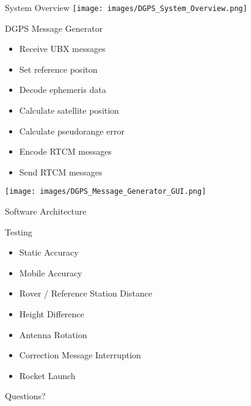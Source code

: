 \documentclass[12pt, compress, xcolor=table]{beamer}
\begin{document}
\begin{frame}{System Overview}
 \texttt{[image: images/DGPS\_System\_Overview.png]}
\end{frame}

\begin{frame}{DGPS Message Generator}
 \begin{minipage}{0.6\textwidth}
  \begin{itemize}
   \setlength\itemsep{0.3cm}
   \item Receive UBX messages
   \item Set reference positon
   \item Decode ephemeris data
   \item Calculate satellite position
   \item Calculate pseudorange error
   \item Encode RTCM messages
   \item Send RTCM messages
  \end{itemize}
 \end{minipage}
 \begin{minipage}{0.35\textwidth}
  \texttt{[image: images/DGPS\_Message\_Generator\_GUI.png]}
 \end{minipage}
\end{frame}

\begin{frame}{Software Architecture}
 
\end{frame}

\begin{frame}{Testing}
 \begin{itemize}
  \item Static Accuracy
  \item Mobile Accuracy
  \item Rover / Reference Station Distance
  \item Height Difference \\[10pt]
  \item Antenna Rotation
  \item Correction Message Interruption \\[10pt]
  \item Rocket Launch
 \end{itemize}
\end{frame}


\begin{frame}[standout]
 Questions?
\end{frame}
\end{document}
